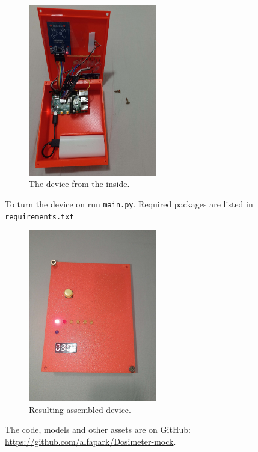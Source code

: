 \documentclass{article}
\begin{document}
\begin{figure}[ht]
    \centering
    \includegraphics[width=0.5\textwidth]{imgs/Inside.jpg}
    \caption{The device from the inside.}
\end{figure}

    To turn the device on run \texttt{main.py}.
    Required packages are listed in \texttt{requirements.txt}

\begin{figure}[ht]
    \centering
    \includegraphics[width=0.5\textwidth]{imgs/Box1.jpg}
    \caption{Resulting assembled device.}
\end{figure}

    The code, models and other assets are on GitHub: \url{https://github.com/alfapark/Dosimeter-mock}.


\subsection{}
\end{document}
